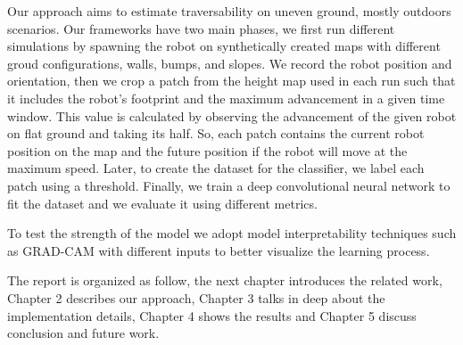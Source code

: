 \documentclass[../document.tex]{subfiles}
\begin{document}
Our approach aims to estimate traversability on uneven ground, mostly outdoors scenarios. Our frameworks have two main phases, we first run different simulations by spawning the robot on synthetically
created maps with different groud configurations, walls, bumps, and slopes. We record the robot position and orientation, then we crop a patch from the height map used in each run such that it includes the robot's footprint and the maximum advancement in a given time window. This value is calculated by observing the advancement of the given robot on flat ground and taking its half. So, each patch contains the current robot position on the map and the future position if the robot will move at the maximum speed. Later, to create the dataset for the classifier, we label each patch using a threshold. Finally, we train a deep convolutional neural network to fit the dataset and we evaluate it using different metrics.

To test the strength of the model we adopt model interpretability techniques such as GRAD-CAM with different inputs to better visualize the learning process.

The report is organized as follow, the next chapter introduces the related work, Chapter 2 describes our approach, Chapter 3 talks in deep about the implementation details,
Chapter 4 shows the results and Chapter 5 discuss conclusion and future work.
\end{document}
